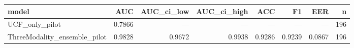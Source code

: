 \begin{tabular}{lrrrrrrr}
\toprule
model & AUC & AUC_ci_low & AUC_ci_high & ACC & F1 & EER & n \\
\midrule
UCF_only_pilot & 0.7866 & — & — & — & — & — & 196 \\
ThreeModality_ensemble_pilot & 0.9828 & 0.9672 & 0.9938 & 0.9286 & 0.9239 & 0.0867 & 196 \\
\bottomrule
\end{tabular}

